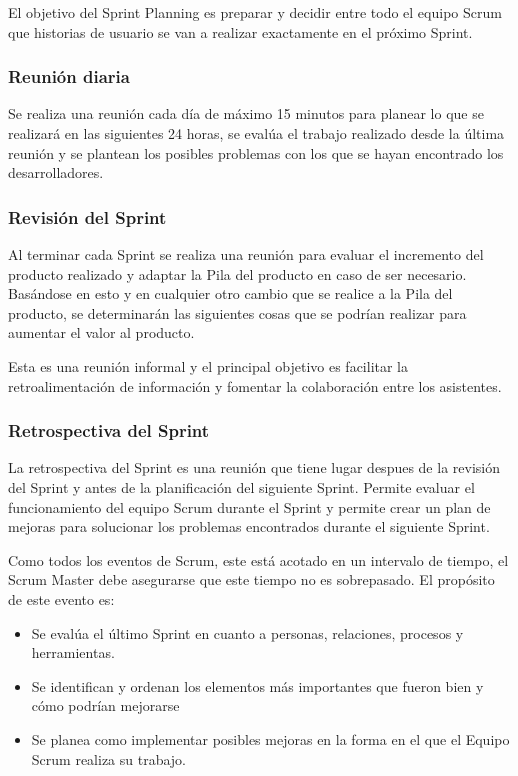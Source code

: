 El objetivo del Sprint Planning es preparar y decidir entre todo el equipo Scrum que historias
de usuario se van a realizar exactamente en el próximo Sprint.

\subsubsection{Reunión diaria}

Se realiza una reunión cada día de máximo 15 minutos para planear lo que se realizará en las 
siguientes 24 horas, se evalúa el trabajo realizado desde la última reunión y se plantean los 
posibles problemas con los que se hayan encontrado los desarrolladores.

\subsubsection{Revisión del Sprint}

Al terminar cada Sprint se realiza una reunión para evaluar el incremento del producto realizado y 
adaptar la Pila del producto en caso de ser necesario. Basándose en esto y en cualquier otro cambio
que se realice a la Pila del producto, se determinarán las siguientes cosas que se podrían realizar 
para aumentar el valor al producto.

Esta es una reunión informal y el principal objetivo es facilitar la retroalimentación de información y 
fomentar la colaboración entre los asistentes.

\subsubsection{Retrospectiva del Sprint}

La retrospectiva del Sprint es una reunión que tiene lugar despues de la revisión del Sprint y antes 
de la planificación del siguiente Sprint. Permite evaluar el funcionamiento del equipo Scrum durante 
el Sprint y permite crear un plan de mejoras para solucionar los problemas encontrados durante el 
siguiente Sprint. 

Como todos los eventos de Scrum, este está acotado en un intervalo de tiempo, el Scrum Master 
debe asegurarse que este tiempo no es sobrepasado. El propósito de este evento es: 

\begin{itemize}
	\item Se evalúa el último Sprint en cuanto a personas, relaciones, procesos y herramientas.
	\item Se identifican y ordenan los elementos más importantes que fueron bien y cómo podrían 
	mejorarse
	\item Se planea como implementar posibles mejoras en la forma en el que el Equipo Scrum realiza
	su trabajo.
\end{itemize}

